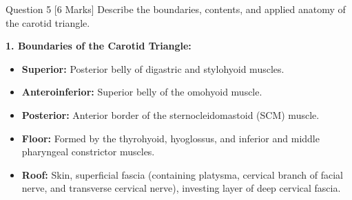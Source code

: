 \documentclass[11pt,a4paper]{article}
\begin{document}
\begin{qbox}{Question 5 [6 Marks]}
Describe the boundaries, contents, and applied anatomy of the carotid triangle.
\end{qbox}

\begin{ansbox}
\textbf{1. Boundaries of the Carotid Triangle:}
\begin{itemize}[leftmargin=*]
    \item \textbf{Superior:} Posterior belly of digastric and stylohyoid muscles.
    \item \textbf{Anteroinferior:} Superior belly of the omohyoid muscle.
    \item \textbf{Posterior:} Anterior border of the sternocleidomastoid (SCM) muscle.
    \item \textbf{Floor:} Formed by the thyrohyoid, hyoglossus, and inferior and middle pharyngeal constrictor muscles.
    \item \textbf{Roof:} Skin, superficial fascia (containing platysma, cervical branch of facial nerve, and transverse cervical nerve), investing layer of deep cervical fascia.
\end{itemize}


\end{ansbox}
\end{document}
